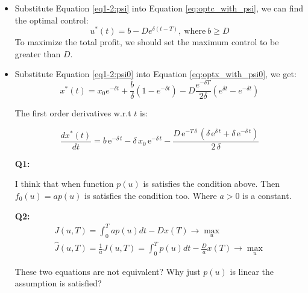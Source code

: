 \documentclass{article}
\begin{document}
\begin{itemize}
    \item Substitute Equation \eqref{eq1-2:psi} into Equation \eqref{eq:optc_with_psi}, we can find the optimal control:
    \begin{equation}
        u^*(t)=b-De^{\delta (t-T)},\ \text{where}\ b\geq D
    \end{equation}
    To maximize the total profit, we should set the maximum control to be greater than $D$.
    \item Substitute Equation \eqref{eq1-2:psi0} into Equation \eqref{eq:optx_with_psi0}, we get:
    \begin{equation}\label{eq1-2:optx}
        x^*(t)=x_0e^{-\delta t}+\frac{b}{\delta}(1-e^{-\delta t})-D\frac{e^{-\delta T}}{2\delta}(e^{\delta t}-e^{-\delta t})
    \end{equation}

    The first order derivatives w.r.t $t$ is:

    \begin{equation}\label{eq1-2:optx_first_order_t}
        \frac{d x^*(t)}{dt}=b\,{\mathrm{e}}^{-\delta \,t}-\delta \,x_{0}\,{\mathrm{e}}^{-\delta \,t}-\frac{D\,{\mathrm{e}}^{-T\,\delta }\,\left(\delta \,{\mathrm{e}}^{\delta \,t}+\delta \,{\mathrm{e}}^{-\delta \,t}\right)}{2\,\delta }
    \end{equation}


    




    {\bf Q1:}
    
    I think that when function $p(u)$ is satisfies the condition above. Then $f_0(u)=ap(u)$ is satisfies the condition too. Where $a>0$ is a constant.


    {\bf Q2:}
    \begin{gather*}
        J(u,T)=\int_{0}^{T}ap(u)dt-Dx(T) \rightarrow \max_{u}\\
        \hat{J}(u,T)=\frac{1}{a}J(u,T)=\int_{0}^{T}p(u)dt-\frac{D}{a}x(T) \rightarrow \max_{u}
    \end{gather*}

    These two equations are not equivalent? Why just $p(u)$ is linear the assumption is satisfied?

\end{itemize}
\end{document}
